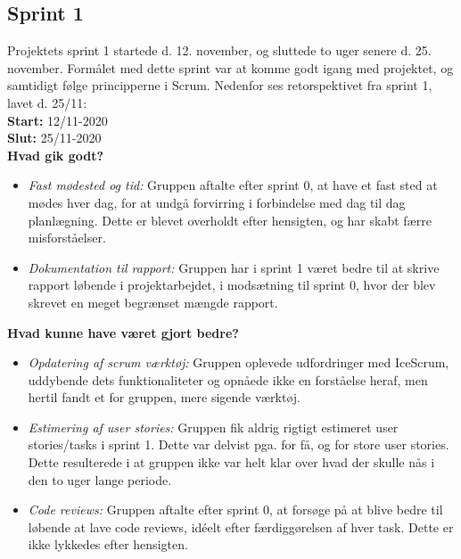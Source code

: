 \subsection{Sprint 1}
Projektets sprint 1 startede d. 12. november, og sluttede to uger senere d. 25. november.
Formålet med dette sprint var at komme godt igang med projektet, og samtidigt følge principperne i Scrum. 
Nedenfor ses retorspektivet fra sprint 1, lavet d. 25/11: \\

\textbf{Start:} 12/11-2020 \\
\textbf{Slut:} 25/11-2020 \\

\textbf{Hvad gik godt?}
\begin{itemize}
    \item \textit{Fast mødested og tid:} Gruppen aftalte efter sprint 0, at have et fast sted at mødes hver dag, for at undgå 
    forvirring i forbindelse med dag til dag planlægning. Dette er blevet overholdt efter hensigten, og har skabt færre misforståelser. 
    \item \textit{Dokumentation til rapport:} Gruppen har i sprint 1 været bedre til at skrive rapport løbende i projektarbejdet, 
    i modsætning til sprint 0, hvor der blev skrevet en meget begrænset mængde rapport. 
\end{itemize}

\textbf{Hvad kunne have været gjort bedre?}
\begin{itemize}
    \item \textit{Opdatering af scrum værktøj:} Gruppen oplevede udfordringer med IceScrum, uddybende dets funktionaliteter 
    og opnåede ikke en forståelse heraf, men hertil fandt et for gruppen, mere sigende værktøj.  
    \item \textit{Estimering af user stories:} Gruppen fik aldrig rigtigt estimeret user stories/tasks i sprint 1. Dette var delvist pga. 
    for få, og for store user stories. Dette resulterede i at gruppen ikke var helt klar over hvad der skulle nås i den to uger lange periode. 
    \item \textit{Code reviews:} Gruppen aftalte efter sprint 0, at forsøge på at blive bedre til løbende at lave code reviews, idéelt efter færdiggørelsen
    af hver task. Dette er ikke lykkedes efter hensigten.
\end{itemize}

